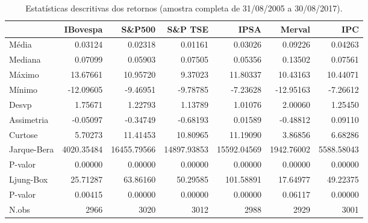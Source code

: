 \begin{table}[ht]
\centering
\caption{Estatísticas descritivas dos retornos (amostra completa de 31/08/2005 a 30/08/2017).} 
\label{tab:descritivas}
\begin{tabular}{lrrrrrr}
  \hline
 & IBovespa & S\&P500 & S\&P TSE & IPSA & Merval & IPC \\ 
  \hline
Média & 0.03124 & 0.02318 & 0.01161 & 0.03026 & 0.09226 & 0.04263 \\ 
  Mediana & 0.07099 & 0.05903 & 0.07505 & 0.05356 & 0.13502 & 0.07561 \\ 
  Máximo & 13.67661 & 10.95720 & 9.37023 & 11.80337 & 10.43163 & 10.44071 \\ 
  Mínimo & -12.09605 & -9.46951 & -9.78785 & -7.23628 & -12.95163 & -7.26612 \\ 
  Desvp & 1.75671 & 1.22793 & 1.13789 & 1.01076 & 2.00060 & 1.25450 \\ 
  Assimetria & -0.05097 & -0.34749 & -0.68193 & 0.01589 & -0.48812 & 0.09110 \\ 
  Curtose & 5.70273 & 11.41453 & 10.80965 & 11.19090 & 3.86856 & 6.68286 \\ 
  Jarque-Bera & 4020.35484 & 16455.79566 & 14897.93853 & 15592.04569 & 1942.76002 & 5588.58043 \\ 
  P-valor & 0.00000 & 0.00000 & 0.00000 & 0.00000 & 0.00000 & 0.00000 \\ 
  Ljung-Box & 25.71287 & 63.86160 & 50.29585 & 101.58891 & 17.64977 & 49.22375 \\ 
  P-valor & 0.00415 & 0.00000 & 0.00000 & 0.00000 & 0.06117 & 0.00000 \\ 
  N.obs & 2966 & 3020 & 3012 & 2988 & 2929 & 3001 \\ 
   \hline
\end{tabular}
\end{table}
